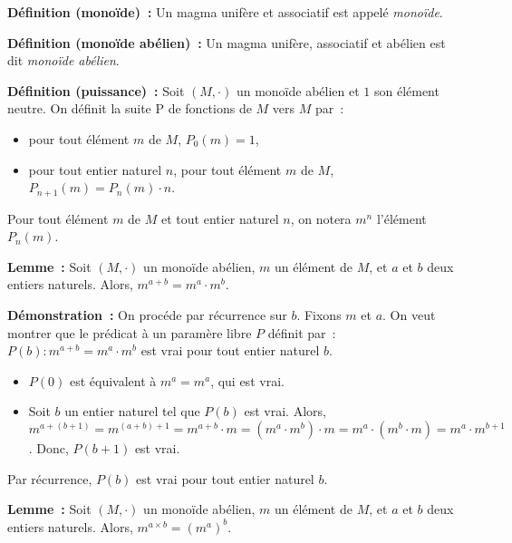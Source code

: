     \hfill \square

\medskip

\noindent\textbf{Définition (monoïde) :} Un magma unifère et associatif est appelé \textit{monoïde}.

\medskip

\noindent\textbf{Définition (monoïde abélien) :} Un magma unifère, associatif et abélien est dit \textit{monoïde abélien}.

\medskip

\noindent\textbf{Définition (puissance) :} Soit $(M,\cdot)$ un monoïde abélien et $1$ son élément neutre.
    On définit la suite $\mathrm{P}$ de fonctions de $M$ vers $M$ par : 
    \begin{itemize}[nosep]
        \item pour tout élément $m$ de $M$, $P_0(m) = 1$,
        \item pour tout entier naturel $n$, pour tout élément $m$ de $M$, $P_{n+1}(m) = P_n(m) \cdot n$.
    \end{itemize}
    Pour tout élément $m$ de $M$ et tout entier naturel $n$, on notera $m^n$ l'élément $P_n(m)$.

\medskip

\noindent\textbf{Lemme :} Soit $(M,\cdot)$ un monoïde abélien, $m$ un élément de $M$, et $a$ et $b$ deux entiers naturels. 
    Alors, $m^{a + b} = m^a \cdot m^b$.

\medskip

\noindent\textbf{Démonstration :} On procéde par récurrence sur $b$.
    Fixons $m$ et $a$.
    On veut montrer que le prédicat à un paramère libre $P$ définit par : $P(b): m^{a+b} = m^a \cdot m^b$ est vrai pour tout entier naturel $b$.
    \begin{itemize}[nosep]
        \item $P(0)$ est équivalent à $m^a = m^a$, qui est vrai.
        \item Soit $b$ un entier naturel tel que $P(b)$ est vrai. 
            Alors, $m^{a+(b+1)} = m^{(a+b)+1} = m^{a+b} \cdot m = (m^a \cdot m^b) \cdot m = m^a \cdot (m^b \cdot m) = m^a \cdot m^{b+1}$.
            Donc, $P(b+1)$ est vrai.
    \end{itemize}
    Par récurrence, $P(b)$ est vrai pour tout entier naturel $b$.

    \done

\medskip

\noindent\textbf{Lemme :} Soit $(M,\cdot)$ un monoïde abélien, $m$ un élément de $M$, et $a$ et $b$ deux entiers naturels. 
    Alors, $m^{a \times b} = (m^a)^b$.

